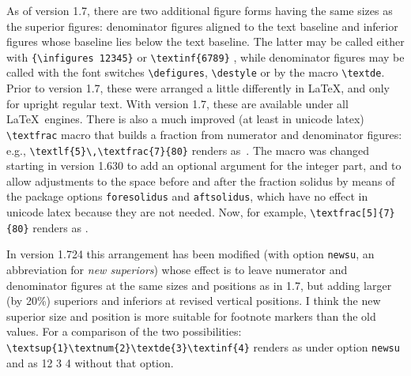 \documentclass[\fsc]{article}
\theoremstyle{oldplain}
\theoremstyle{plain}
\begin{document}
As of version 1.7, there are two additional figure forms having the same sizes as the superior figures: denominator figures aligned to the text baseline and inferior figures whose baseline lies below the text baseline. The latter may be called either with \verb|{\infigures 12345}| {} or \verb|\textinf{6789}| , while denominator figures may be called with the font switches \verb|\defigures|, \verb|\destyle| or by the macro \verb|\textde|. Prior to version 1.7, these were arranged a little differently in LaTeX, and only for upright regular text. With version 1.7, these are available under all \LaTeX\ engines. There is also a much improved (at least in unicode latex) \verb|\textfrac| macro that builds a fraction from numerator and denominator figures: e.g., \verb|\textlf{5}\,\textfrac{7}{80}| renders as \,. The macro was changed starting in version 1.630 to add an optional argument for the integer part, and to allow adjustments to the space before and after the fraction solidus by means of the package options {\tt foresolidus} and {\tt aftsolidus}, which have no effect in unicode latex because they are not needed. Now, for example, \verb|\textfrac[5]{7}{80}| renders as .

In version 1.724 this arrangement has been modified (with option {\tt newsu}, an abbreviation for \emph{new superiors}) whose effect is to leave numerator and denominator figures at the same sizes and positions as in 1.7, but adding larger (by 20\%) superiors and inferiors at revised vertical positions. I think the new superior size and position is more suitable for footnote markers than the old values. For a comparison of the two possibilities:\\ \verb|\textsup{1}\textnum{2}\textde{3}\textinf{4}| renders as  under option {\tt newsu} and as {12}%
{3}%
{4} without that option.
\end{document}
